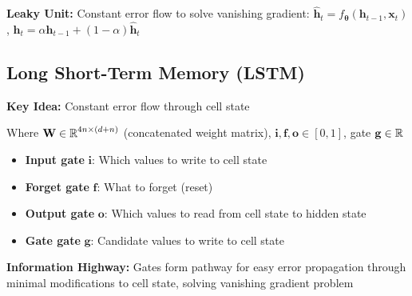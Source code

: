 \textbf{Leaky Unit:} Constant error flow to solve vanishing gradient: {\small $\hat{\mathbf{h}}_t = f_{\mathbf{\theta}}(\mathbf{h}_{t-1}, \mathbf{x}_t)$, $\mathbf{h}_t = \alpha \mathbf{h}_{t-1} + (1-\alpha) \hat{\mathbf{h}}_t$ }

\subsection{Long Short-Term Memory (LSTM)}

\textbf{Key Idea:} Constant error flow through cell state

{ \footnotesize
{}

}

Where $\mathbf{W} \in \operatorname{\mathbb{R}}^{4n \times (d+n)}$ (concatenated weight matrix), $\mathbf{i}, \mathbf{f}, \mathbf{o} \in [0,1]$, gate $\mathbf{g} \in \operatorname{\mathbb{R}}$


\begin{itemize}
    \item \textbf{Input gate} $\mathbf{i}$: Which values to write to cell state
    \item \textbf{Forget gate} $\mathbf{f}$: What to forget (reset)
    \item \textbf{Output gate} $\mathbf{o}$: Which values to read from cell state to hidden state
    \item \textbf{Gate gate} $\mathbf{g}$: Candidate values to write to cell state
\end{itemize}

\textbf{Information Highway:} Gates form pathway for easy error propagation through minimal modifications to cell state, solving vanishing gradient problem